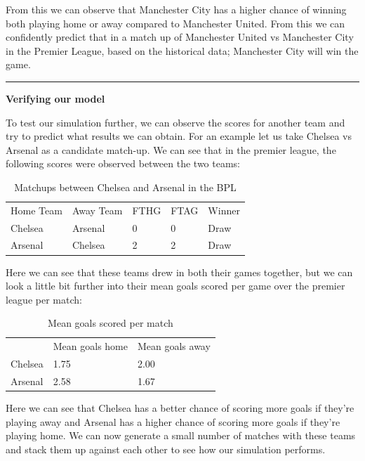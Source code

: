\documentclass[12pt]{report}
\begin{document}
\vspace{0.3cm}
\noindent
From this we can observe that Manchester City has a higher chance of winning both playing home or away compared to Manchester United. From this we can confidently predict that in a match up of Manchester United vs Manchester City in the Premier League, based on the historical data; Manchester City will win the game.

\noindent\rule{2cm}{0.4pt}

\vspace{0.3cm}
\noindent
\textbf{Verifying our model} 

\noindent
To test our simulation further, we can observe the scores for another team and try to predict what results we can obtain. For an example let us take Chelsea vs Arsenal as a candidate match-up. We can see that in the premier league, the following scores were observed between the two teams:

\vspace{0.3cm}

\begin{table}[ht]
\centering
\caption{Matchups between Chelsea and Arsenal in the BPL}
\label{t4}
\begin{tabular}{lllll}
Home Team & Away Team & FTHG & FTAG & Winner \\
Chelsea   & Arsenal   & 0    & 0    & Draw   \\
Arsenal   & Chelsea   & 2    & 2    & Draw  
\end{tabular}
\end{table}

\clearpage
Here we can see that these teams drew in both their games together, but we can look a little bit further into their mean goals scored per game over the premier league per match:

\vspace{0.3cm}

\begin{table}[ht]
\centering
\caption{Mean goals scored per match}
\label{t5}
\begin{tabular}{lll}
        & Mean goals home & Mean goals away \\
Chelsea & 1.75            & 2.00            \\
Arsenal & 2.58            & 1.67           
\end{tabular}
\end{table}

Here we can see that Chelsea has a better chance of scoring more goals if they're playing away and Arsenal has a higher chance of scoring more goals if they're playing home. We can now generate a small number of matches with these teams and stack them up against each other to see how our simulation performs.
\end{document}
